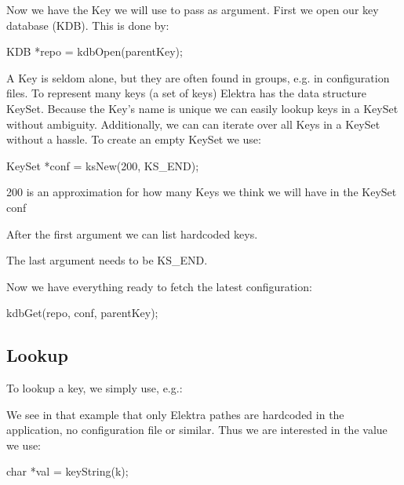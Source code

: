 Now we have the {\ttfamily Key} we will use to pass as argument. First we open our key database (K\+D\+B). This is done by\+: \begin{DoxyVerb}    KDB *repo = kdbOpen(parentKey);
\end{DoxyVerb}


A {\ttfamily Key} is seldom alone, but they are often found in groups, e.\+g. in configuration files. To represent many keys (a set of keys) Elektra has the data structure {\ttfamily Key\+Set}. Because the {\ttfamily Key}'s name is unique we can easily lookup keys in a {\ttfamily Key\+Set} without ambiguity. Additionally, we can can iterate over all {\ttfamily Key}s in a {\ttfamily Key\+Set} without a hassle. To create an empty {\ttfamily Key\+Set} we use\+: \begin{DoxyVerb}    KeySet *conf = ksNew(200,
            KS_END);
\end{DoxyVerb}



\begin{DoxyItemize}
\item 200 is an approximation for how many {\ttfamily Key}s we think we will have in the {\ttfamily Key\+Set} conf
\item After the first argument we can list hardcoded keys.
\item The last argument needs to be {\ttfamily K\+S\+\_\+\+E\+N\+D}.
\end{DoxyItemize}

Now we have everything ready to fetch the latest configuration\+: \begin{DoxyVerb}    kdbGet(repo, conf, parentKey);
\end{DoxyVerb}


\subsection*{Lookup}

To lookup a key, we simply use, e.\+g.\+: 


We see in that example that only Elektra pathes are hardcoded in the application, no configuration file or similar. Thus we are interested in the value we use\+: \begin{DoxyVerb}    char *val = keyString(k);
\end{DoxyVerb}


